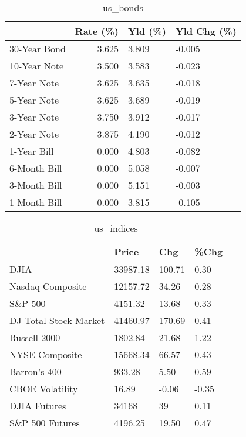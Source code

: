 \documentclass{article}%
\begin{document}
\begin{table}[htbp]%
\caption{us\_bonds}%
\centering%
\begin{adjustbox}{width=1\textwidth}%
\begin{tabular}{lrll}
\toprule
             &  Rate (\%) & Yld (\%) & Yld Chg (\%) \\
\midrule
30-Year Bond &     3.625 &   3.809 &      -0.005 \\
10-Year Note &     3.500 &   3.583 &      -0.023 \\
 7-Year Note &     3.625 &   3.635 &      -0.018 \\
 5-Year Note &     3.625 &   3.689 &      -0.019 \\
 3-Year Note &     3.750 &   3.912 &      -0.017 \\
 2-Year Note &     3.875 &   4.190 &      -0.012 \\
 1-Year Bill &     0.000 &   4.803 &      -0.082 \\
6-Month Bill &     0.000 &   5.058 &      -0.007 \\
3-Month Bill &     0.000 &   5.151 &      -0.003 \\
1-Month Bill &     0.000 &   3.815 &      -0.105 \\
\bottomrule
\end{tabular}
%
\end{adjustbox}%
\end{table}

%


\begin{table}[htbp]%
\caption{us\_indices}%
\centering%
\begin{adjustbox}{width=1\textwidth}%
\begin{tabular}{llll}
\toprule
                      &    Price &    Chg &  \%Chg \\
\midrule
                 DJIA & 33987.18 & 100.71 &  0.30 \\
     Nasdaq Composite & 12157.72 &  34.26 &  0.28 \\
              S\&P 500 &  4151.32 &  13.68 &  0.33 \\
DJ Total Stock Market & 41460.97 & 170.69 &  0.41 \\
         Russell 2000 &  1802.84 &  21.68 &  1.22 \\
       NYSE Composite & 15668.34 &  66.57 &  0.43 \\
         Barron's 400 &   933.28 &   5.50 &  0.59 \\
      CBOE Volatility &    16.89 &  -0.06 & -0.35 \\
         DJIA Futures &    34168 &     39 &  0.11 \\
      S\&P 500 Futures &  4196.25 &  19.50 &  0.47 \\
\bottomrule
\end{tabular}
%
\end{adjustbox}%
\end{table}
\end{document}
